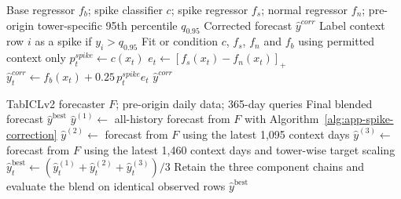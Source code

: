 \begin{algorithm}[H]
\caption{Probability-gated spike correction for a foundation-model forecast}
\label{alg:app-spike-correction}
\small
\begin{algorithmic}[1]
\Require Base regressor $f_b$; spike classifier $c$; spike regressor $f_s$;
normal regressor $f_n$; pre-origin tower-specific 95th percentile $q_{0.95}$
\Ensure Corrected forecast $\hat y^{corr}$
\State Label context row $i$ as a spike if $y_i>q_{0.95}$
\State Fit or condition $c$, $f_s$, $f_n$ and $f_b$ using permitted context only
    \State $p_t^{spike}\gets c(x_t)$
    \State $e_t\gets[f_s(x_t)-f_n(x_t)]_+$
    \State $\hat y_t^{corr}\gets f_b(x_t)+0.25\,p_t^{spike}e_t$
\EndFor
\State \Return $\hat y^{corr}$
\end{algorithmic}
\end{algorithm}

\begin{algorithm}[H]
\caption{Best-performing TabICL forecasting model}
\label{alg:app-best-tabicl-forecast}
\small
\begin{algorithmic}[1]
\Require TabICLv2 forecaster $F$; pre-origin daily data; 365-day queries
\Ensure Final blended forecast $\hat y^{\mathrm{best}}$
\State $\hat y^{(1)}\gets$ all-history forecast from $F$ with
Algorithm~\ref{alg:app-spike-correction}
\State $\hat y^{(2)}\gets$ forecast from $F$ using the latest 1,095 context days
\State $\hat y^{(3)}\gets$ forecast from $F$ using the latest 1,460 context days and
tower-wise target scaling
    \State $\hat y_t^{\mathrm{best}}\gets
    (\hat y_t^{(1)}+\hat y_t^{(2)}+\hat y_t^{(3)})/3$
\EndFor
\State Retain the three component chains and evaluate the blend on identical observed rows
\State \Return $\hat y^{\mathrm{best}}$
\end{algorithmic}
\end{algorithm}

\FloatBarrier

